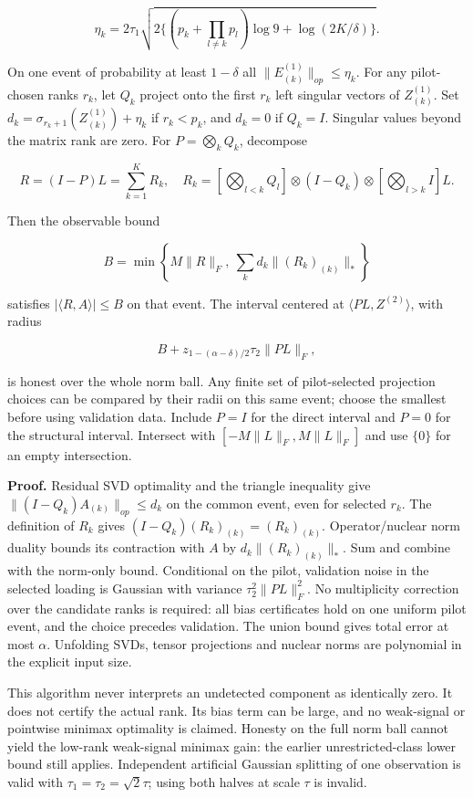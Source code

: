 \[\eta_k=2\tau_1\sqrt{2\{(p_k+\prod_{l\ne k}p_l)\log9+
\log(2K/\delta)\}}.\]

On one event of probability at least \(1-\delta\) all
\(\|E^{(1)}_{(k)}\|_{op}\le\eta_k\). For any pilot-chosen ranks \(r_k\),
let \(Q_k\) project onto the first \(r_k\) left singular vectors of
\(Z^{(1)}_{(k)}\). Set \(d_k=\sigma_{r_k+1}(Z^{(1)}_{(k)})+\eta_k\) if
\(r_k<p_k\), and \(d_k=0\) if \(Q_k=I\). Singular values beyond the
matrix rank are zero. For \(P=\bigotimes_k Q_k\), decompose

\[R=(I-P)L=\sum_{k=1}^K R_k,\quad
R_k=\left[\bigotimes_{l<k}Q_l\right]\otimes(I-Q_k)
\otimes\left[\bigotimes_{l>k}I\right]L.\]

Then the observable bound

\[B=\min\left\{M\|R\|_F,\ \sum_k d_k\|(R_k)_{(k)}\|_*\right\}\]

satisfies \(|\langle R,A\rangle|\le B\) on that event. The interval
centered at \(\langle PL,Z^{(2)}\rangle\), with radius

\[B+z_{1-(\alpha-\delta)/2}\tau_2\|PL\|_F,\]

is honest over the whole norm ball. Any finite set of pilot-selected
projection choices can be compared by their radii on this same event;
choose the smallest before using validation data. Include \(P=I\) for
the direct interval and \(P=0\) for the structural interval. Intersect
with \([-M\|L\|_F,M\|L\|_F]\) and use \(\{0\}\) for an empty
intersection.

\textbf{Proof.} Residual SVD optimality and the triangle inequality give
\(\|(I-Q_k)A_{(k)}\|_{op}\le d_k\) on the common event, even for
selected \(r_k\). The definition of \(R_k\) gives
\((I-Q_k)(R_k)_{(k)}=(R_k)_{(k)}\). Operator/nuclear norm duality bounds
its contraction with \(A\) by \(d_k\|(R_k)_{(k)}\|_*\). Sum and combine
with the norm-only bound. Conditional on the pilot, validation noise in
the selected loading is Gaussian with variance \(\tau_2^2\|PL\|_F^2\).
No multiplicity correction over the candidate ranks is required: all
bias certificates hold on one uniform pilot event, and the choice
precedes validation. The union bound gives total error at most
\(\alpha\). Unfolding SVDs, tensor projections and nuclear norms are
polynomial in the explicit input size.

This algorithm never interprets an undetected component as identically
zero. It does not certify the actual rank. Its bias term can be large,
and no weak-signal or pointwise minimax optimality is claimed. Honesty
on the full norm ball cannot yield the low-rank weak-signal minimax
gain: the earlier unrestricted-class lower bound still applies.
Independent artificial Gaussian splitting of one observation is valid
with \(\tau_1=\tau_2=\sqrt2\tau\); using both halves at scale \(\tau\)
is invalid.

